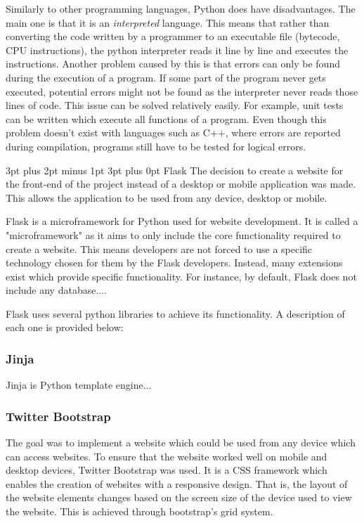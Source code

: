 \documentclass[12pt,a4paper]{article}
\makeatletter
\renewcommand\subsection{\@startsection {subsection}{1}{2mm} %
                                        {3pt plus 2pt minus 1pt} %
                                        {3pt plus 0pt} %
                                        {\normalfont\bfseries}}
\makeatother
\begin{document}
Similarly to other programming languages, Python does have disadvantages. The main one is that it is an \textit{interpreted} language. This means that rather than converting the code written by a programmer to an executable file (bytecode, CPU instructions), the python interpreter reads it line by line and executes the instructions. Another problem caused by this is that errors can only be found during the execution of a program. If some part of the program never gets executed, potential errors might not be found as the interpreter never reads those lines of code. This issue can be solved relatively easily. For example, unit tests can be written which execute all functions of a program. Even though this problem doesn't exist with languages such as C++, where errors are reported during compilation, programs still have to be tested for logical errors.

\subsection{Flask}
The decision to create a website for the front-end of the project instead of a desktop or mobile application was made. This allows the application to be used from any device, desktop or mobile. 

Flask is a microframework for Python used for website development. It is called a "microframework" as it aims to only include the core functionality required to create a website. This means developers are not forced to use a specific technology chosen for them by the Flask developers. Instead, many extensions exist which provide specific functionality. For instance, by default, Flask does not include any database....

Flask uses several python libraries to achieve its functionality. A description of each one is provided below:

\subsubsection{Jinja}
Jinja is Python template engine...

\subsubsection{Twitter Bootstrap}
The goal was to implement a website which could be used from any device which can access websites. To ensure that the website worked well on mobile and desktop devices, Twitter Bootstrap was used. It is a CSS framework which enables the creation of websites with a responsive design. That is, the layout of the website elements changes based on the screen size of the device used to view the website. This is achieved through bootstrap's grid system.
\end{document}
